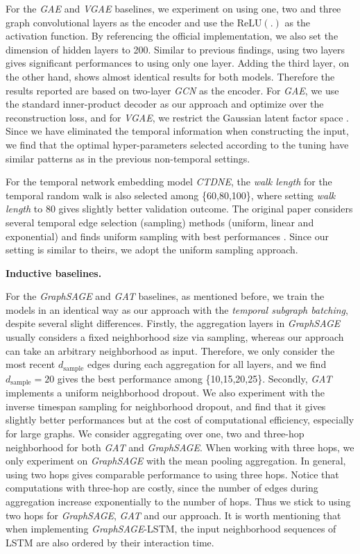 \documentclass{article} %
\begin{document}
For the \textsl{GAE} and \textsl{VGAE} baselines, we experiment on using one, two and three graph convolutional layers as the encoder \citep{kipf2016semi} and use the $\text{ReLU}(.)$ as the activation function. By referencing the official implementation, we also set the dimension of hidden layers to 200. Similar to previous findings, using two layers gives significant performances to using only one layer. Adding the third layer, on the other hand, shows almost identical results for both models. Therefore the results reported are based on two-layer \textsl{GCN} as the encoder. For \textsl{GAE}, we use the standard inner-product decoder as our approach and optimize over the reconstruction loss, and for \textsl{VGAE}, we restrict the Gaussian latent factor space \citep{kipf2016variational}. Since we have eliminated the temporal information when constructing the input, we find that the optimal hyper-parameters selected according to the tuning have similar patterns as in the previous non-temporal settings.

For the temporal network embedding model \textsl{CTDNE}, the \emph{walk length} for the temporal random walk is also selected among \{60,80,100\}, where setting \emph{walk length} to 80 gives slightly better validation outcome. The original paper considers several temporal edge selection (sampling) methods (uniform, linear and exponential) and finds uniform sampling with best performances \citep{nguyen2018continuous}. Since our setting is similar to theirs, we adopt the uniform sampling approach. 

\textbf{Inductive baselines.}

For the \textsl{GraphSAGE} and \textsl{GAT} baselines, as mentioned before, we train the models in an identical way as our approach with the \emph{temporal subgraph batching}, despite several slight differences. Firstly, the aggregation layers in \textsl{GraphSAGE} usually considers a fixed neighborhood size via sampling, whereas our approach can take an arbitrary neighborhood as input. Therefore, we only consider the most recent $d_{\text{sample}}$ edges during each aggregation for all layers, and we find $d_{\text{sample}}=20$ gives the best performance among \{10,15,20,25\}. Secondly, \textsl{GAT} implements a uniform neighborhood dropout. We also experiment with the inverse timespan sampling for neighborhood dropout, and find that it gives slightly better performances but at the cost of computational efficiency, especially for large graphs. We consider aggregating over one, two and three-hop neighborhood for both \textsl{GAT} and \textsl{GraphSAGE}. When working with three hops, we only experiment on \textsl{GraphSAGE} with the mean pooling aggregation. In general, using two hops gives comparable performance to using three hops. Notice that computations with three-hop are costly, since the number of edges during aggregation increase exponentially to the number of hops. Thus we stick to using two hops for \textsl{GraphSAGE}, \textsl{GAT} and our approach. It is worth mentioning that when implementing \textsl{GraphSAGE}-LSTM, the input neighborhood sequences of LSTM are also ordered by their interaction time.
\end{document}
